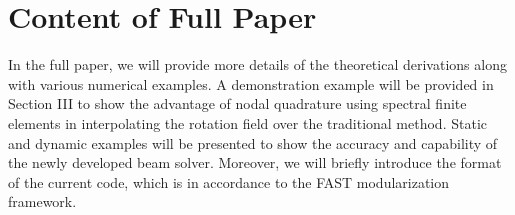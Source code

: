 \documentclass{aiaa-tc}
\begin{document}
 
 \section{Content of Full Paper}
In the full paper, we will provide more details of the theoretical
derivations along with various numerical examples. A demonstration example will be provided in Section III to show the advantage of nodal quadrature using spectral finite elements in interpolating the rotation field over the traditional method. Static and dynamic examples will be presented to show the accuracy and capability of the newly developed beam solver. Moreover, we will briefly introduce the format of the current code, which is in accordance to the FAST modularization framework. 








\end{document}
